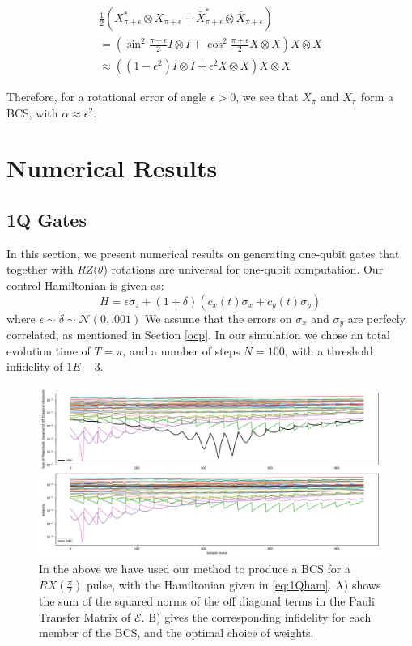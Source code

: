 \documentclass[aps,nofootinbib,pra,notitlepage,twocolumn]{revtex4-1}
\begin{document}
\begin{equation}
  \begin{gathered}
    \frac{1}{2}(X^*_{\pi + \epsilon}\otimes X_{\pi + \epsilon} + \bar X^*_{\pi + \epsilon}\otimes \bar X_{\pi + \epsilon}) \\  
    = (\sin^2{\frac{\pi + \epsilon}{2}}I\otimes I + \cos^2{\frac{\pi + \epsilon}{2}}X\otimes X)X\otimes X \\
    \approx ((1 - \epsilon^2)I\otimes I + \epsilon^2X\otimes X)X\otimes X
  \end{gathered}
\end{equation}
 
Therefore, for a rotational error of angle $\epsilon > 0$, we see that $X_\pi$ and  $\bar X_\pi$  form a BCS, with $\alpha\approx\epsilon^2$.


\section{Numerical Results}\label{numerical}
\subsection{1Q Gates}\label{1Q Gates}
 In this section, we present numerical results on generating one-qubit gates that together with $RZ(\theta$) rotations are universal for one-qubit computation. Our control Hamiltonian is given as: 
\begin{equation}\label{eq:1Qham}
  H = \epsilon\sigma_z + (1 + \delta)(c_x(t)\sigma_x + c_y(t)\sigma_y)
\end{equation}
where $\epsilon \sim \delta \sim \mathcal{N}(0, .001)$ We assume that the errors on $\sigma_x$ and $\sigma_y$ are perfecly correlated, as mentioned in Section \ref{ocp}. In our simulation we chose an total evolution time of $T=\pi$, and a number of steps $N=100$, with a threshold infidelity of $1E-3$.
\begin{figure}
\centering
\includegraphics[width=\textwidth]{x2.png}
\caption{In the above we have used our method to produce a BCS for a $RX(\frac{\pi}{2})$ pulse, with the Hamiltonian given in \ref{eq:1Qham}. A) shows the sum of the squared norms of the off diagonal terms in the Pauli Transfer Matrix of $\mathcal{E}$. B) gives the corresponding infidelity for each member of the BCS, and the optimal choice of weights.}
\end{figure}
\end{document}
